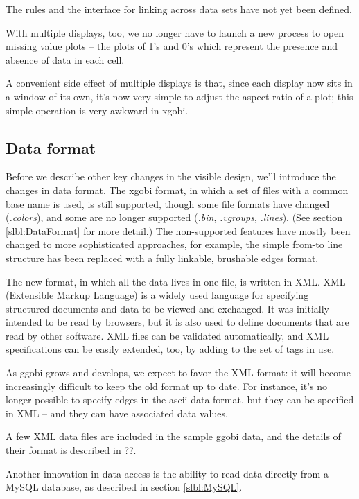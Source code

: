 \documentclass[11pt]{article}
\begin{document}
The rules and the interface for linking across data sets have not yet
been defined.

With multiple displays, too, we no longer have to launch a new
process to open missing value plots -- the plots of 1's and 0's
which represent the presence and absence of data in each cell.

A convenient side effect of multiple displays is that, since each
display now sits in a window of its own, it's now very simple to
adjust the aspect ratio of a plot; this simple operation is very
awkward in xgobi.

\subsection {Data format}

Before we describe other key changes in the visible design, we'll
introduce the changes in data format.  The xgobi format, in which a
set of files with a common base name is used, is still supported,
though some file formats have changed ({\em .colors}), and some are no
longer supported ({\em .bin}, {\em .vgroups}, {\em .lines}).  (See
section \ref{slbl:DataFormat} for more detail.) The non-supported
features have mostly been changed to more sophisticated approaches,
for example, the simple from-to line structure has been replaced with
a fully linkable, brushable edges format.

The new format, in which all the data lives in one file, is written
in XML.  XML (Extensible Markup Language) is a widely used language
for specifying structured documents and data to be viewed and
exchanged.  It was initially intended to be read by browsers, but it
is also used to define documents that are read by other software.
XML files can be validated automatically, and XML specifications can
be easily extended, too, by adding to the set of tags in use.

As ggobi grows and develops, we expect to favor the XML format:  it
will become increasingly difficult to keep the old format up to
date.  For instance, it's no longer possible to specify edges
in the ascii data format, but they can be specified in XML -- and
they can have associated data values.

A few XML data files are included in the sample ggobi data, and
the details of their format is described in ??.

Another innovation in data access is the ability to read data
directly from a MySQL database, as described in section \ref{slbl:MySQL}.
\end{document}
